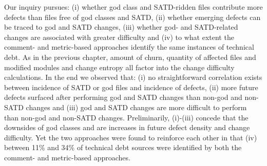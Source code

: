 Our inquiry pursues: (i) whether god class and SATD-ridden files contribute more defects than files free of god classes and SATD, (ii) whether emerging defects can be traced to god and SATD changes, (iii) whether god- and SATD-related changes are associated with greater difficulty and (iv) to what extent the comment- and metric-based approaches identify the same instances of technical debt. As in the previous chapter, amount of churn, quantity of affected files and modified modules and change entropy all factor into the change difficulty calculations. In the end we observed that: (i) no straightforward correlation exists between incidence of SATD or god files and incidence of defects, (ii) more future defects surfaced after performing god and SATD changes than non-god and non-SATD changes and (iii) god and SATD changes are more difficult to perform than non-god and non-SATD changes. Preliminarily, (i)-(iii) concede that the downsides of god classes and \SATD are increases in future defect density and change difficulty. Yet the two approaches were found to reinforce each other in that (iv) between 11\% and 34\% of technical debt sources were identified by both the comment- and metric-based approaches.



